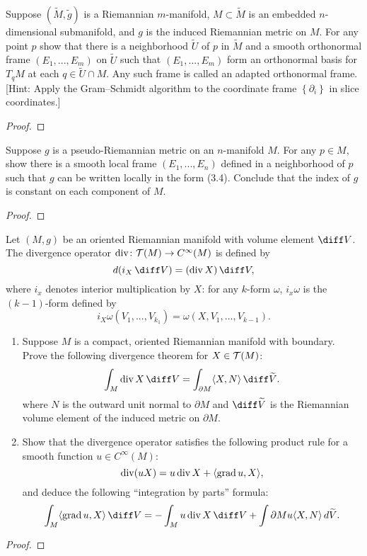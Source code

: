 \begin{problem}
Suppose $(\widetilde M,\tilde g)$ is a Riemannian $m$-manifold,
$M\subset\widetilde M$ is an embedded $n$-dimensional submanifold, and $g$
is the induced Riemannian metric on $M$. For any point $p$ show that there
is a neighborhood $\widetilde U$ of $p$ in $\widetilde M$ and a smooth
orthonormal frame $(E_1,...,E_m)$ on $\widetilde U$ such that
$(E_1,...,E_m)$ form an orthonormal basis for $T_qM$ at each
$q\in\widetilde{U}\cap M$. Any such frame is called an adapted orthonormal
frame. [Hint: Apply the Gram--Schmidt algorithm to the coordinate frame
$\left\{\partial_i\right\}$ in slice coordinates.]
\end{problem}
\begin{proof}
\end{proof}
\newpage

\begin{problem}
Suppose $g$ is a pseudo-Riemannian metric on an $n$-manifold $M$. For any
$p\in M$, show there is a smooth local frame $(E_1,...,E_n)$ defined in a
neighborhood of $p$ such that $g$ can be written locally in the form
(3.4). Conclude that the index of $g$ is constant on each component of
$M$.
\end{problem}
\begin{proof}
\end{proof}
\newpage

\begin{problem}
Let $(M,g)$ be an oriented Riemannian manifold with volume element
$\diff V$. The divergence operator $\operatorname{div}\colon\mathcal{T}(M)\to C^\infty(M)$ is
defined by
\[
d(i_X\,\diff V)=(\Div X)\,\diff V,
\]
where $i_x$ denotes interior multiplication by $X$: for any $k$-form
$\omega$, $i_x\omega$ is the $(k-1)$-form defined by
\[
i_X\omega(V_1,...,V_{k_1})=\omega(X,V_1,...,V_{k-1}).
\]
\begin{enumerate}[label=(\alph*)]
\item Suppose $M$ is a compact, oriented Riemannian manifold with
  boundary. Prove the following divergence theorem for $X\in\mathcal{T}(M)$:
\[
\int_M\Div X\,\diff V=\int_{\partial M}\langle X,N \rangle\,\diff\widetilde V.
\]
where $N$ is the outward unit normal to $\partial M$ and $\diff\widetilde V$ is
the Riemannian volume element of the induced metric on $\partial M$.
\item Show that the divergence operator satisfies the following product
  rule for a smooth function $u\in C^\infty(M)$:
\[
\operatorname{div}(uX)=u\operatorname{div} X+\langle\operatorname{grad} u,X\rangle,
\]
and deduce the following ``integration by parts'' formula:
\[
\int_M\langle\Grad u,X\rangle\,\diff V=-\int_M u\Div X\,\diff V+\int{\partial M}
u\langle X,N\rangle\,d\widetilde{V}.
\]
\end{enumerate}
\end{problem}
\begin{proof}
\end{proof}
\newpage

